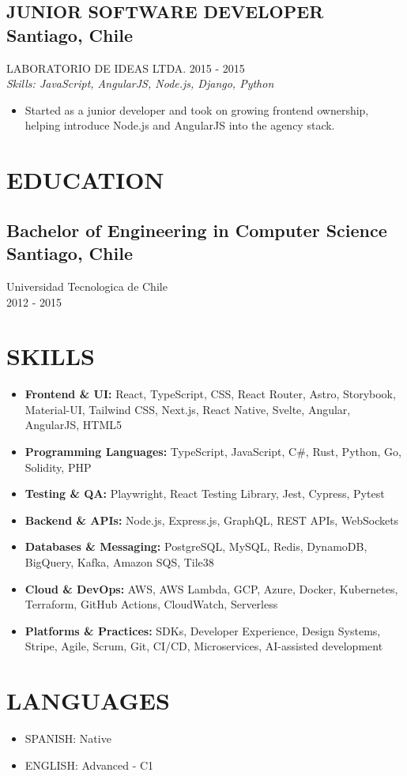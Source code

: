 \documentclass{article}
\newcommand{\SubHeading}[1]{
   \subsection*{#1}\vspace{-0.5em}
}
\newcommand{\WorkExperience}[2]{
   \subsection*{#1}
   \vspace{-1em}
   \uppercase{#2}
}
\newcommand{\Skills}[1]{
   \textit{Skills: #1}
}
\begin{document}
\WorkExperience{JUNIOR SOFTWARE DEVELOPER \hfill Santiago, Chile}{Laboratorio de Ideas Ltda. \hfill 2015 {-} 2015} \\
\Skills{JavaScript, AngularJS, Node.js, Django, Python}
\begin{itemize}
	\item Started as a junior developer and took on growing frontend ownership, helping introduce Node.js and AngularJS into the agency stack.
\end{itemize}

\section*{EDUCATION}
\SubHeading{Bachelor of Engineering in Computer Science \hfill Santiago, Chile}
Universidad Tecnologica de Chile \\[0.1em]
2012 {-} 2015

\section*{SKILLS}
\begin{itemize}
	\item \textbf{Frontend \& UI:} React, TypeScript, CSS, React Router, Astro, Storybook, Material-UI, Tailwind CSS, Next.js, React Native, Svelte, Angular, AngularJS, HTML5
	\item \textbf{Programming Languages:} TypeScript, JavaScript, C\#, Rust, Python, Go, Solidity, PHP
	\item \textbf{Testing \& QA:} Playwright, React Testing Library, Jest, Cypress, Pytest
	\item \textbf{Backend \& APIs:} Node.js, Express.js, GraphQL, REST APIs, WebSockets
	\item \textbf{Databases \& Messaging:} PostgreSQL, MySQL, Redis, DynamoDB, BigQuery, Kafka, Amazon SQS, Tile38
	\item \textbf{Cloud \& DevOps:} AWS, AWS Lambda, GCP, Azure, Docker, Kubernetes, Terraform, GitHub Actions, CloudWatch, Serverless
	\item \textbf{Platforms \& Practices:} SDKs, Developer Experience, Design Systems, Stripe, Agile, Scrum, Git, CI/CD, Microservices, AI-assisted development
\end{itemize}

\section*{LANGUAGES}
\begin{itemize}[left=0pt]
	\item SPANISH: Native
	\item ENGLISH: Advanced {-} C1
\end{itemize}
\end{document}

